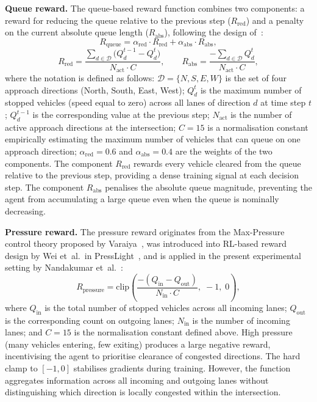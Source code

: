 \noindent\textbf{Queue reward.}\;
The queue-based reward function combines two components: a reward for reducing
the queue relative to the previous step ($R_\mathrm{red}$) and a penalty on
the current absolute queue length ($R_\mathrm{abs}$), following the design
of~\cite{nandakumar2025}:
\begin{equation}
    R_\mathrm{queue} = \alpha_\mathrm{red}\cdot R_\mathrm{red}
                     + \alpha_\mathrm{abs}\cdot R_\mathrm{abs},
\end{equation}
\begin{equation}
    R_\mathrm{red} =
        \frac{\displaystyle\sum_{d\in\mathcal{D}}
              \bigl(Q_d^{t-1} - Q_d^{t}\bigr)}
             {N_\mathrm{act}\cdot C},
    \qquad
    R_\mathrm{abs} =
        \frac{\displaystyle -\sum_{d\in\mathcal{D}} Q_d^{t}}
             {N_\mathrm{act}\cdot C},
\end{equation}
where the notation is defined as follows:
$\mathcal{D} = \{N, S, E, W\}$ is the set of four approach directions
(North, South, East, West);
$Q_d^{t}$ is the maximum number of stopped vehicles (speed equal to zero)
across all lanes of direction $d$ at time step $t$;
$Q_d^{t-1}$ is the corresponding value at the previous step;
$N_\mathrm{act}$ is the number of active approach directions at the
intersection;
$C = 15$ is a normalisation constant empirically estimating the maximum number
of vehicles that can queue on one approach direction;
$\alpha_\mathrm{red} = 0.6$ and $\alpha_\mathrm{abs} = 0.4$ are the weights of
the two components.
The component $R_\mathrm{red}$ rewards every vehicle cleared from the queue
relative to the previous step, providing a dense training signal at each
decision step. The component $R_\mathrm{abs}$ penalises the absolute queue
magnitude, preventing the agent from accumulating a large queue even when the
queue is nominally decreasing.

\noindent\textbf{Pressure reward.}\;
The pressure reward originates from the Max-Pressure control theory proposed
by Varaiya~\cite{maxpressure2013}, was introduced into RL-based reward design
by Wei et~al.\ in PressLight~\cite{presslight2019}, and is applied in the
present experimental setting by Nandakumar et~al.~\cite{nandakumar2025}:
\begin{equation}
    R_\mathrm{pressure} =
        \mathrm{clip}\!\left(
          \frac{-(Q_\mathrm{in} - Q_\mathrm{out})}
               {N_\mathrm{in}\cdot C},\;
          -1,\; 0
        \right),
\end{equation}
where $Q_\mathrm{in}$ is the total number of stopped vehicles across all
incoming lanes; $Q_\mathrm{out}$ is the corresponding count on outgoing lanes;
$N_\mathrm{in}$ is the number of incoming lanes; and $C = 15$ is the
normalisation constant defined above. High pressure (many vehicles entering,
few exiting) produces a large negative reward, incentivising the agent to
prioritise clearance of congested directions. The hard clamp to $[-1, 0]$
stabilises gradients during training. However, the function aggregates
information across all incoming and outgoing lanes without distinguishing which
direction is locally congested within the intersection.

